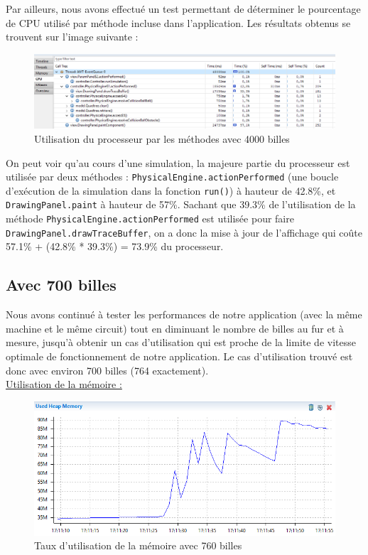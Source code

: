 \documentclass{report}
\begin{document}
\newpage
Par ailleurs, nous avons effectué un test permettant de déterminer le pourcentage de CPU utilisé par méthode incluse dans l’application. Les résultats obtenus se trouvent sur l’image suivante :

\begin{figure}[H]
\centering
\includegraphics[scale=0.6]{CPU.png}
\caption{Utilisation du processeur par les méthodes avec 4000 billes}
\end{figure}

On peut voir qu’au cours d’une simulation, la majeure partie du processeur est utilisée par deux méthodes : \texttt{PhysicalEngine.actionPerformed} (une boucle d’exécution de la simulation dans la fonction \texttt{run()}) à hauteur de 42.8\%, et \texttt{DrawingPanel.paint} à hauteur de 57\%. Sachant que 39.3\% de l’utilisation de la méthode \texttt{PhysicalEngine.actionPerformed} est utilisée pour faire \texttt{DrawingPanel.drawTraceBuffer}, on a donc la mise à jour de l’affichage qui coûte 57.1\% + (42.8\% * 39.3\%) = 73.9\% du processeur.


\subsection{Avec 700 billes}

Nous avons continué à tester les performances de notre application (avec la même machine et le même circuit) tout en diminuant le nombre de billes au fur et à mesure, jusqu’à obtenir un cas d’utilisation qui est proche de la limite de vitesse optimale de fonctionnement de notre application. Le cas d’utilisation trouvé est donc avec environ 700 billes (764 exactement). \\

\underline{Utilisation de la mémoire : }

\begin{figure}[H]
\centering
\includegraphics[scale=0.8]{timeline760_memory.png}
\caption{Taux d'utilisation de la mémoire avec 760 billes}
\end{figure}
\end{document}
